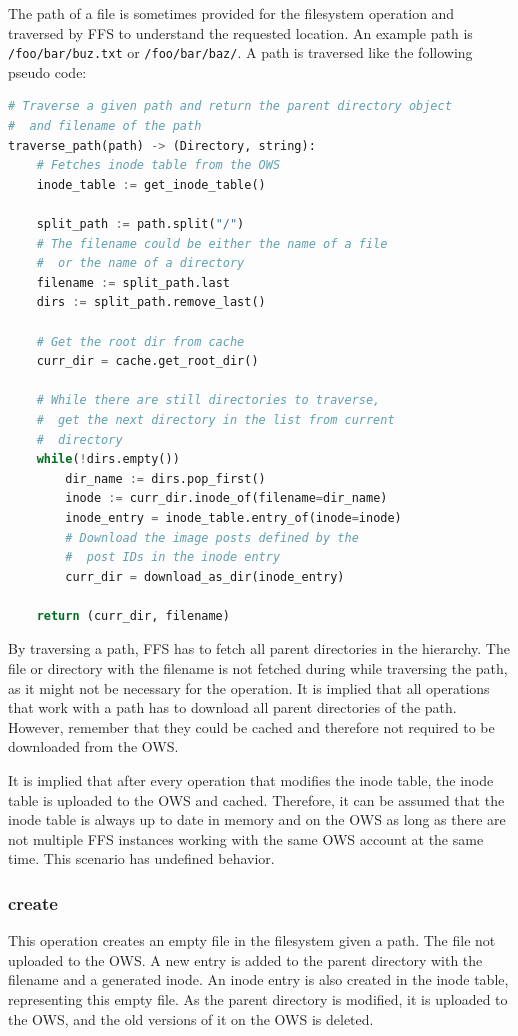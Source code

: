 The path of a file is sometimes provided for the filesystem operation and traversed by FFS to understand the requested location. An example path is \texttt{/foo/bar/buz.txt} or \texttt{/foo/bar/baz/}. A path is traversed like the following pseudo code:
\begin{lstlisting}[language=python, caption={Pseudocode of traversing a given path, returning the \texttt{Directory} and the filename}, label=lst:traverse_path,breaklines=true]
# Traverse a given path and return the parent directory object
#  and filename of the path
traverse_path(path) -> (Directory, string):
	# Fetches inode table from the OWS
	inode_table := get_inode_table()
	
	split_path := path.split("/")
	# The filename could be either the name of a file 
	#  or the name of a directory
	filename := split_path.last
	dirs := split_path.remove_last()

	# Get the root dir from cache
	curr_dir = cache.get_root_dir()

	# While there are still directories to traverse,
	#  get the next directory in the list from current
	#  directory
	while(!dirs.empty())
		dir_name := dirs.pop_first()
		inode := curr_dir.inode_of(filename=dir_name)
		inode_entry = inode_table.entry_of(inode=inode)
		# Download the image posts defined by the 
		#  post IDs in the inode entry
		curr_dir = download_as_dir(inode_entry)
	
	return (curr_dir, filename)

\end{lstlisting}
By traversing a path, FFS has to fetch all parent directories in the hierarchy. The file or directory with the filename is not fetched during while traversing the path, as it might not be necessary for the operation. It is implied that all operations that work with a path has to download all parent directories of the path. However, remember that they could be cached and therefore not required to be downloaded from the OWS. 

It is implied that after every operation that modifies the inode table, the inode table is uploaded to the OWS and cached. Therefore, it can be assumed that the inode table is always up to date in memory and on the OWS as long as there are not multiple FFS instances working with the same OWS account at the same time. This scenario has undefined behavior. 

\subsubsection{create}
This operation creates an empty file in the filesystem given a path. The file not uploaded to the OWS. A new entry is added to the parent directory with the filename and a generated inode. An inode entry is also created in the inode table, representing this empty file. As the parent directory is modified, it is uploaded to the OWS, and the old versions of it on the OWS is deleted.

